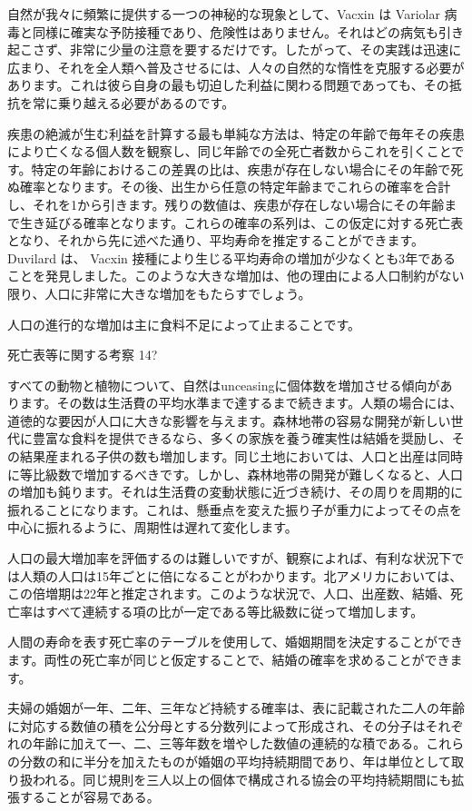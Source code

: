 \documentclass[a4paper,11pt,openany]{ltjsbook}
\begin{document}
自然が我々に頻繁に提供する一つの神秘的な現象として、Vacxin は Variolar 病毒と同様に確実な予防接種であり、危険性はありません。それはどの病気も引き起こさず、非常に少量の注意を要するだけです。したがって、その実践は迅速に広まり、それを全人類へ普及させるには、人々の自然的な惰性を克服する必要があります。これは彼ら自身の最も切迫した利益に関わる問題であっても、その抵抗を常に乗り越える必要があるのです。

疾患の絶滅が生む利益を計算する最も単純な方法は、特定の年齢で毎年その疾患により亡くなる個人数を観察し、同じ年齢での全死亡者数からこれを引くことです。特定の年齢におけるこの差異の比は、疾患が存在しない場合にその年齢で死ぬ確率となります。その後、出生から任意の特定年齢までこれらの確率を合計し、それを1から引きます。残りの数値は、疾患が存在しない場合にその年齢まで生き延びる確率となります。これらの確率の系列は、この仮定に対する死亡表となり、それから先に述べた通り、平均寿命を推定することができます。Duvilard は、 Vacxin 接種により生じる平均寿命の増加が少なくとも3年であることを発見しました。このような大きな増加は、他の理由による人口制約がない限り、人口に非常に大きな増加をもたらすでしょう。

人口の進行的な増加は主に食料不足によって止まることです。

死亡表等に関する考察 14?

すべての動物と植物について、自然はunceasingに個体数を増加させる傾向があります。その数は生活費の平均水準まで達するまで続きます。人類の場合には、道徳的な要因が人口に大きな影響を与えます。森林地帯の容易な開発が新しい世代に豊富な食料を提供できるなら、多くの家族を養う確実性は結婚を奨励し、その結果産まれる子供の数も増加します。同じ土地においては、人口と出産は同時に等比級数で増加するべきです。しかし、森林地帯の開発が難しくなると、人口の増加も鈍ります。それは生活費の変動状態に近づき続け、その周りを周期的に振れることになります。これは、懸垂点を変えた振り子が重力によってその点を中心に振れるように、周期性は遅れて変化します。

人口の最大増加率を評価するのは難しいですが、観察によれば、有利な状況下では人類の人口は15年ごとに倍になることがわかります。北アメリカにおいては、この倍増期は22年と推定されます。このような状況で、人口、出産数、結婚、死亡率はすべて連続する項の比が一定である等比級数に従って増加します。

人間の寿命を表す死亡率のテーブルを使用して、婚姻期間を決定することができます。両性の死亡率が同じと仮定することで、結婚の確率を求めることができます。

夫婦の婚姻が一年、二年、三年など持続する確率は、表に記載された二人の年齢に対応する数値の積を公分母とする分数列によって形成され、その分子はそれぞれの年齢に加えて一、二、三等年数を増やした数値の連続的な積である。これらの分数の和に半分を加えたものが婚姻の平均持続期間であり、年は単位として取り扱われる。同じ規則を三人以上の個体で構成される協会の平均持続期間にも拡張することが容易である。
\end{document}
